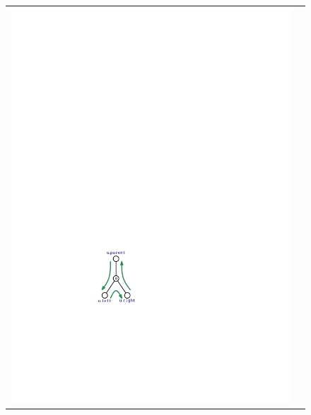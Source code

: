 \begin{figure}
  \begin{center}
    \begin{tabular}{cc}
      \includegraphics[scale=0.90909]{figs/bintree-traverse-2}

\end{tabular}
\end{center}
\end{figure}
